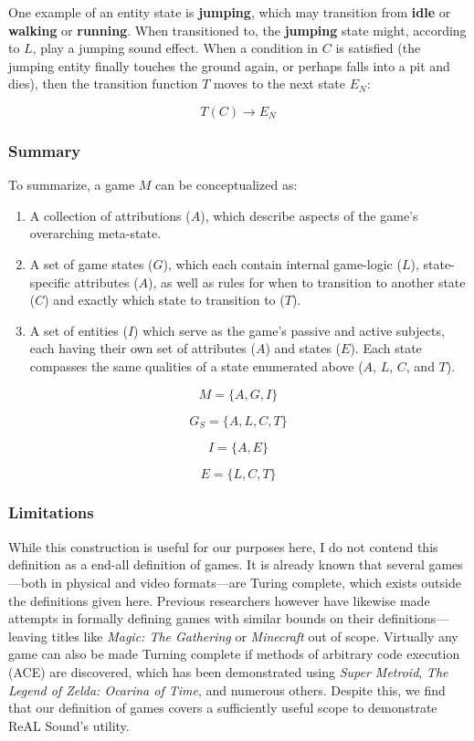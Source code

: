 \documentclass{report}
\newcommand{\rs}{ReAL Sound\xspace}
\begin{document}
One example of an entity state is \textbf{jumping}, which may transition from \textbf{idle} or \textbf{walking} or \textbf{running}. When transitioned to, the \textbf{jumping} state might, according to $L$, play a jumping sound effect. When a condition in $C$ is satisfied (the jumping entity finally touches the ground again, or perhaps falls into a pit and dies), then the transition function $T$ moves to the next state $E_N$:

$$T(C) \longrightarrow E_N$$

\subsubsection{Summary}
To summarize, a game $M$ can be conceptualized as:

\begin{enumerate}
    \item A collection of attributions ($A$), which describe aspects of the game's overarching meta-state.
    \item A set of game states ($G$), which each contain internal game-logic ($L$), state-specific attributes ($A$), as well as rules for when to transition to another state ($C$) and exactly which state to transition to ($T$).   
    \item A set of entities ($I$) which serve as the game's passive and active subjects, each having their own set of attributes ($A$) and states ($E$). Each state compasses the same qualities of a state enumerated above ($A$, $L$, $C$, and $T$).   
\end{enumerate}

$$
M = \{A, G, I\}
$$

$$
G_S = \{ A, L, C, T \}
$$

$$I = \{A, E\}$$

$$E = \{L, C, T\}$$


\subsubsection{Limitations}
While this construction is useful for our purposes here, I do not contend this definition as a end-all definition of games. It is already known that several games---both in physical and video formats---are Turing complete, which exists outside the definitions given here. Previous researchers however have likewise made attempts in formally defining games with similar bounds on their definitions---leaving titles like \emph{Magic: The Gathering}\cite{churchill2019magicgatheringturingcomplete} or \emph{Minecraft}\cite{Hildreth1980} out of scope\cite{Demaine}. Virtually any game can also be made Turning complete if methods of arbitrary code execution (ACE) are discovered, which has been demonstrated using \emph{Super Metroid}\cite{Mawhorter_Aytemiz_Karth_Smith_2021}, \emph{The Legend of Zelda: Ocarina of Time}\cite{OoT}, and numerous others. Despite this, we find that our definition of games covers a sufficiently useful scope to demonstrate \rs's utility.
\end{document}
